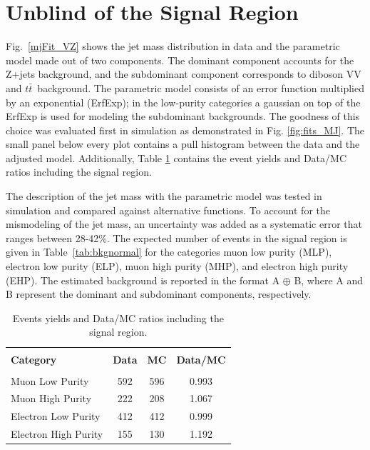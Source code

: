 \clearpage
\section{Unblind of the Signal Region}
Fig.~\ref{mjFit_VZ} shows the jet mass distribution in data and the parametric model made out of two components. The dominant component accounts for the Z+jets background, and the subdominant component corresponds to diboson VV and $t\bar{t}\,$ background. The parametric model consists of an error function multiplied by an exponential (ErfExp); in the low-purity categories a gaussian on top of the ErfExp is used for modeling the subdominant backgrounds. The goodness of this choice was evaluated first in simulation as demonstrated in Fig. \ref{fig:fits_MJ}. The small panel below every plot contains a pull histogram between the data and the adjusted model. Additionally, Table \ref{dataMCunblind} contains the event yields and Data/MC ratios including the signal region.

The description of the jet mass with the parametric model was tested in simulation and compared against alternative functions. To account for the mismodeling of the jet mass, an uncertainty was added as a systematic error that ranges between 28-42\%. The expected number of events in the signal region is given in Table~\ref{tab:bkgnormal} for the categories muon low purity (MLP), electron low purity (ELP), muon high purity (MHP), and electron high purity (EHP). The estimated background is reported in the format A $\oplus$ B, where A  and B represent the dominant and subdominant components, respectively.

\begin{table}[h!]
\begin{center}
\caption[Data/MC ratios after unblind]{Events yields and Data/MC ratios including the signal region.}
\label{dataMCunblind}
\begin{tabular}{lccc}
\hline\\[-0.2cm]
\textbf{Category}    & \textbf{Data} & \textbf{MC}   &\textbf{Data/MC} \\[0.2cm]
\hline\hline\\[-0.2cm]
Muon Low Purity      & 592           & 596           & 0.993 \\[0.2cm]
Muon High Purity     & 222           & 208           & 1.067 \\[0.2cm]
Electron Low Purity  & 412           & 412           & 0.999 \\[0.2cm]
Electron High Purity & 155           & 130           & 1.192 \\[0.2cm]
\hline
\end{tabular}
\end{center}
\end{table}

